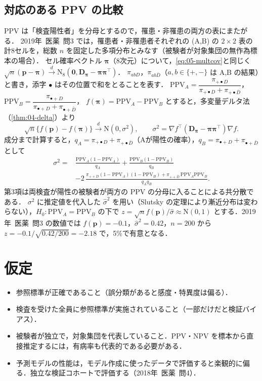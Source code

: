 \documentclass[a4paper,11pt,openany]{ltjsbook}
\newcommand{\tagbox}[2]{\tcbox[on line,boxsep=0.5pt,left=2pt,right=2pt,top=0.5pt,bottom=0.5pt,
  colframe=#1,colback=#1!10,boxrule=0.4pt,arc=1pt]{\scriptsize\bfseries\textcolor{#1}{#2}}}
\newcommand{\Youchui}{\tagbox{bkpurple}{要注意}}
\newcommand{\kakomon}[2]{\mbox{#1年 医薬 問#2}}
\newcommand{\Normal}{\mathrm{N}}
\newcommand{\transp}{^{\top}}
\begin{document}
\subsection{対応のある PPV の比較}\label{subsec:05-ppv}
\Youchui PPV は「検査陽性者」を分母とするので，罹患・非罹患の両方の表にまたがる．
\kakomon{2019}{3} では，罹患者・非罹患者それぞれの (A,B) の $2\times2$ 表の計8セルを，総数 $n$ を固定した多項分布とみなす（被験者が対象集団の無作為標本の場合）．
セル確率ベクトル $\bm\pi$（8次元）について，\cref{eq:05-multcov}と同じく $\sqrt n(\bm p-\bm\pi)\xrightarrow{d}\Normal_8(\bm0,\bm D_{\bm\pi}-\bm\pi\bm\pi\transp)$．
$\pi_{ab D}$，$\pi_{ab\bar D}$（$a,b\in\{+,-\}$ は A,B の結果）と書き，添字 $\bullet$ はその位置で和をとることを表す．
$\mathrm{PPV}_A=\dfrac{\pi_{+\bullet D}}{\pi_{+\bullet D}+\pi_{+\bullet\bar D}}$，$\mathrm{PPV}_B=\dfrac{\pi_{\bullet+D}}{\pi_{\bullet+D}+\pi_{\bullet+\bar D}}$，
$f(\bm\pi)=\mathrm{PPV}_A-\mathrm{PPV}_B$ とすると，多変量デルタ法（\cref{thm:04-delta}）より
\[
\sqrt n\{f(\bm p)-f(\bm\pi)\}\xrightarrow{d}\Normal(0,\sigma^2),\qquad \sigma^2=\nabla f\transp(\bm D_{\bm\pi}-\bm\pi\bm\pi\transp)\nabla f.
\]
成分まで計算すると，$q_A=\pi_{+\bullet D}+\pi_{+\bullet\bar D}$（Aが陽性の確率），$q_B=\pi_{\bullet+D}+\pi_{\bullet+\bar D}$ として
\begin{equation}
\begin{split}
\sigma^2={}&\frac{\mathrm{PPV}_A(1-\mathrm{PPV}_A)}{q_A}+\frac{\mathrm{PPV}_B(1-\mathrm{PPV}_B)}{q_B}\\
&-2\,\frac{\pi_{++D}(1-\mathrm{PPV}_A)(1-\mathrm{PPV}_B)+\pi_{++\bar D}\,\mathrm{PPV}_A\mathrm{PPV}_B}{q_Aq_B}.
\end{split}\label{eq:05-ppvvar}
\end{equation}
第3項は両検査が陽性の被験者が両方の PPV の分母に入ることによる共分散である．
$\sigma^2$ に推定値を代入した $\hat\sigma^2$ を用い（Slutsky の定理により漸近分布は変わらない），$H_0:\mathrm{PPV}_A=\mathrm{PPV}_B$ の下で
$z=\sqrt n f(\bm p)/\hat\sigma\approx\Normal(0,1)$ とする．\kakomon{2019}{3} の数値では $f(\bm p)=-0.1$，$\hat\sigma^2=0.42$，$n=200$ から $z=-0.1/\sqrt{0.42/200}=-2.18$ で，5\%で有意となる．

\section{仮定}\label{sec:05-assump}
\begin{itemize}
\item 参照標準が正確であること（誤分類があると感度・特異度は偏る）．
\item 検査を受けた全員に参照標準が実施されていること（一部だけだと検証バイアス）．
\item 被験者が独立で，対象集団を代表していること．PPV・NPV を標本から直接推定するには，有病率も代表的である必要がある．
\item 予測モデルの性能は，モデル作成に使ったデータで評価すると楽観的に偏る．独立な検証コホートで評価する（\kakomon{2018}{4}）．
\end{itemize}
\end{document}
